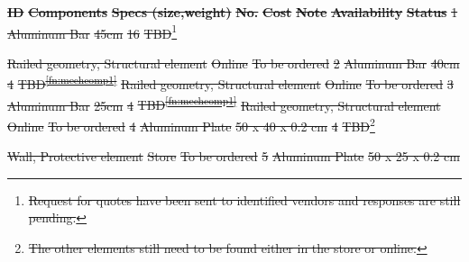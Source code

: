 \documentclass[a4paper,12pt,twoside]{article}
\providecommand{\DIFdeltex}[1]{{\protect\color{red}\sout{#1}}}                      %
\providecommand{\DIFdelbegin}{} %
\providecommand{\DIFdel}[1]{\texorpdfstring{\DIFdeltex{#1}}{}} %
\newcommand{\DIFscaledelfig}{0.5}
\newlength{\DIFdelgraphicswidth} %
\newlength{\DIFdelgraphicsheight} %
\newcommand{\DIFdelincludegraphics}[2][]{%
\sbox{\DIFdelgraphicsbox}{\DIFOincludegraphics[#1]{#2}}%
\settoboxwidth{\DIFdelgraphicswidth}{\DIFdelgraphicsbox} %
\settoboxtotalheight{\DIFdelgraphicsheight}{\DIFdelgraphicsbox} %
\scalebox{\DIFscaledelfig}{%
\parbox[b]{\DIFdelgraphicswidth}{\usebox{\DIFdelgraphicsbox}\\[-\baselineskip] \rule{\DIFdelgraphicswidth}{0em}}\llap{\resizebox{\DIFdelgraphicswidth}{\DIFdelgraphicsheight}{%
\setlength{\unitlength}{\DIFdelgraphicswidth}%
\begin{picture}(1,1)%
\thicklines\linethickness{2pt} %
{\color[rgb]{1,0,0}\put(0,0){\framebox(1,1){}}}%
{\color[rgb]{1,0,0}\put(0,0){\line( 1,1){1}}}%
{\color[rgb]{1,0,0}\put(0,1){\line(1,-1){1}}}%
\end{picture}%
}\hspace*{3pt}}} %
} %
\DeclareRobustCommand{\DIFdelbegin}{\DIFOdelbegin \let\includegraphics\DIFdelincludegraphics} %
\begin{document}
\begin{landscape}
\DIFdelbegin %
\textbf{\DIFdel{ID}} %
\textbf{\DIFdel{Components}} %
\textbf{\DIFdel{Specs (size,weight)}} %
\textbf{\DIFdel{No.}} %
\textbf{\DIFdel{Cost}} %
\textbf{\DIFdel{Note}} %
\textbf{\DIFdel{Availability}} %
\textbf{\DIFdel{Status}} %
\DIFdel{1 }%
\DIFdel{Aluminum Bar }%
\DIFdel{45cm }%
\DIFdel{16 }%
\DIFdel{TBD}\footnote{\DIFdel{Request for quotes have been sent to identified vendors and responses are still pending. }%
} %
\addtocounter{footnote}{-1}%
\DIFdel{Railed geometry, Structural element }%
\DIFdel{Online }%
\DIFdel{To be ordered }%
\DIFdel{2 }%
\DIFdel{Aluminum Bar }%
\DIFdel{40cm }%
\DIFdel{4 }%
\DIFdel{TBD\textsuperscript{\ref{fn:mechcomp1}} }%
\DIFdel{Railed geometry, Structural element }%
\DIFdel{Online }%
\DIFdel{To be ordered }%
\DIFdel{3 }%
\DIFdel{Aluminum Bar }%
\DIFdel{25cm }%
\DIFdel{4 }%
\DIFdel{TBD\textsuperscript{\ref{fn:mechcomp1}} }%
\DIFdel{Railed geometry, Structural element }%
\DIFdel{Online }%
\DIFdel{To be ordered }%
\DIFdel{4 }%
\DIFdel{Aluminum Plate }%
\DIFdel{50 x 40 x 0.2 cm }%
\DIFdel{4 }%
\DIFdel{TBD}\footnote{\DIFdel{The other elements still need to be found either in the store or online. }%
} %
\addtocounter{footnote}{-1}%
\DIFdel{Wall, Protective element }%
\DIFdel{Store }%
\DIFdel{To be ordered }%
\DIFdel{5 }%
\DIFdel{Aluminum Plate }%
\DIFdel{50 x 25 x 0.2 cm }%

\end{landscape}
\end{document}

